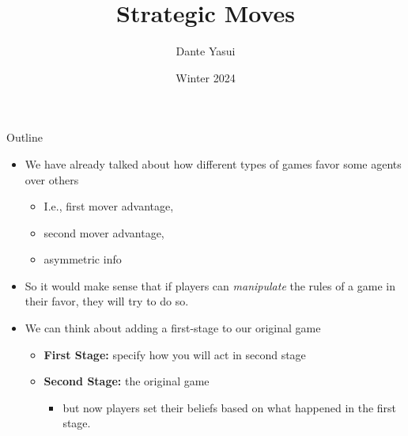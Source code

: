\documentclass{beamer}
\title{Strategic Moves}
\author{Dante Yasui }
\institute{EC327 Game Theory}
\date{Winter 2024}
\theoremstyle{plain}
\begin{document}
\begin{frame}[plain]
    \titlepage
\end{frame}
\addtocounter{framenumber}{-1}

\begin{frame}[plain]{Outline}
  \tableofcontents
\end{frame}
\addtocounter{framenumber}{-1}


\begin{frame}{}
  \begin{itemize}
    \item We have already talked about how different types of games 
    favor some agents over others 
    \begin{itemize}
      \item I.e., first mover advantage, 
      \item second mover advantage, 
      \item asymmetric info 
    \end{itemize}
    \item So it would make sense that if players can \textit{manipulate}
    the rules of a game in their favor, they will try to do so.
  \end{itemize}  
\end{frame}


\begin{frame}{}
  \begin{itemize}
    \item We can think about adding a first-stage to our original game 
    \begin{itemize}
      \item \textbf{First Stage:} specify how you will act in second stage 
      \item \textbf{Second Stage:} the original game
      \begin{itemize}
        \item but now players set their beliefs based on what happened
        in the first stage.
      \end{itemize}
    \end{itemize}
  \end{itemize}  
\end{frame}

\end{document}
